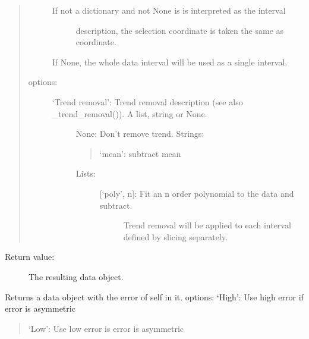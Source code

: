 \documentclass[letterpaper,10pt,english]{sphinxmanual}
\begin{document}
\begin{fulllineitems}
\begin{quote}
\begin{description}
\begin{description}
\item[{If not a dictionary and not None is is interpreted as the interval}] \leavevmode
description, the selection coordinate is taken the same as
coordinate.

\end{description}

If None, the whole data interval will be used as a single interval.

\item[{options:}] \leavevmode\begin{description}
\item[{‘Trend removal’: Trend removal description (see also \_trend\_removal()). A list, string or None.}] \leavevmode
None: Don’t remove trend.
Strings:
\begin{quote}

‘mean’: subtract mean
\end{quote}
\begin{description}
\item[{Lists:}] \leavevmode\begin{description}
\item[{{[}‘poly’, n{]}: Fit an n order polynomial to the data and subtract.}] \leavevmode
Trend removal will be applied to each interval defined by slicing
separately.

\end{description}

\end{description}

\end{description}

\end{description}
\end{quote}
\begin{description}
\item[{Return value:}] \leavevmode
The resulting data object.

\end{description}

\end{fulllineitems}


\begin{fulllineitems}
\label{\detokenize{data_object:flap.data_object.error_value}}
Returns a data object with the error of self in it.
options: ‘High’: Use high error if error is asymmetric
\begin{quote}

‘Low’: Use low error is error is asymmetric
\end{quote}

\end{fulllineitems}
\end{document}
